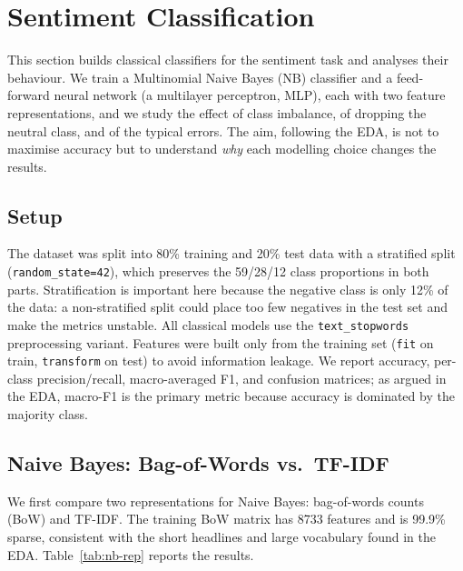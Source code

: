 
\section{Sentiment Classification}
\label{sec:classification}

This section builds classical classifiers for the sentiment task and
analyses their behaviour. We train a Multinomial Naive Bayes (NB)
classifier and a feed-forward neural network (a multilayer perceptron,
MLP), each with two feature representations, and we study the effect of
class imbalance, of dropping the neutral class, and of the typical
errors. The aim, following the EDA, is not to maximise accuracy but to
understand \emph{why} each modelling choice changes the results.

\subsection{Setup}

The dataset was split into 80\% training and 20\% test data with a
stratified split (\texttt{random\_state=42}), which preserves the
59/28/12 class proportions in both parts. Stratification is important
here because the negative class is only 12\% of the data: a non-stratified
split could place too few negatives in the test set and make the
metrics unstable. All classical models use the \texttt{text\_stopwords}
preprocessing variant. Features were built only from the training set
(\texttt{fit} on train, \texttt{transform} on test) to avoid information
leakage. We report accuracy, per-class precision/recall, macro-averaged
F1, and confusion matrices; as argued in the EDA, macro-F1 is the
primary metric because accuracy is dominated by the majority class.

\subsection{Naive Bayes: Bag-of-Words vs.\ TF-IDF}

We first compare two representations for Naive Bayes: bag-of-words
counts (BoW) and TF-IDF. The training BoW matrix has 8733 features and
is 99.9\% sparse, consistent with the short headlines and large
vocabulary found in the EDA. Table~\ref{tab:nb-rep} reports the results.

